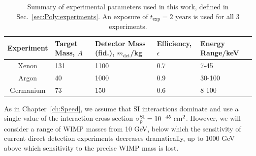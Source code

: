 \begin{table}[t]
  \setlength{\extrarowheight}{2pt}
  \begin{center}
	\begin{tabular}{c|m{1.2cm}m{2.2cm}m{2cm}m{2.1cm}}
        \hline\hline
	Experiment  & Target Mass, $A$ & Detector Mass (fid.), $m_\textrm{det}$/kg & Efficiency, $\epsilon$ & Energy Range/keV\\
	\hline
	Xenon  & 131  & 1100 \cite{Aprile:2012a} & 0.7 \cite{Aprile:2012b} & 7-45 \cite{Aprile:2010} \\
	Argon  & 40  & 1000 & 0.9 \cite{Benetti:2007} & 30-100 \cite{Grandi:2005} \\
        Germanium  & 73  & 150 \cite{Bauer:2013b} & 0.6 \cite{Bauer:2013a} & 8-100 \cite{Bauer:2013a} \\
        \hline\hline
	\end{tabular}
  \end{center}
\caption[Parameter values used for the three mock experiments used in Chapter \ref{ch:Poly}]{Summary of experimental parameters used in this work, defined in Sec.~\ref{sec:Poly:experiments}. An exposure of $t_\textrm{exp} = 2 \textrm{ years}$ is used for all 3 experiments.}
\label{tab:Poly:experiments}
\end{table}



As in Chapter~\ref{ch:Speed}, we assume that SI interactions dominate and use a single value of the interaction cross section $\sigmapsi = 10^{-45} \cmsq$. However, we will consider a range of WIMP masses from 10 GeV, below which the sensitivity of current direct detection experiments decreases dramatically, up to 1000 GeV above which sensitivity to the precise WIMP mass is lost.

